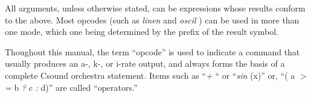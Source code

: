   All arguments, unless otherwise stated, can be expressions whose results conform to the above. Most opcodes (such as \emph{linen}
 and \emph{oscil}
) can be used in more than one mode, which one being determined by the prefix of the result symbol. 


  Thoughout this manual, the term ``opcode'' is used to indicate a command that usually produces an a-, k-, or i-rate output, and always forms the basis of a complete Csound orchestra statement. Items such as ``\emph{+}
`` or ``\emph{sin}
(x)'' or, ``( a \emph{$>$=}
 b \emph{?}
 c \emph{:}
 d)'' are called ``operators.'' 


\begin{comment}
\begin{tabular}{lcr}
Previous &Home &Next \\
Syntax of the Orchestra &Up &Orchestra Statement Types

\end{tabular}



\end{comment}
